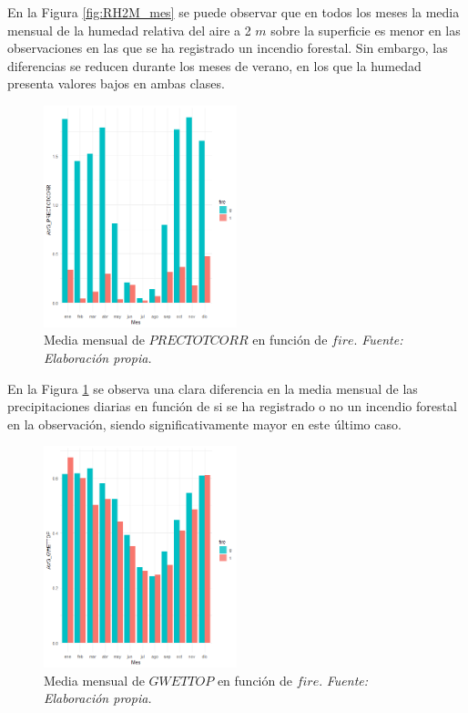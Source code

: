 \documentclass[12pt,a4paper,]{book}
\numberwithin{dummy}{section}
\theoremstyle{ocrenumbox}
\theoremstyle{blacknumex}
\theoremstyle{blacknumbox}
\theoremstyle{ocrenum}
\theoremstyle{ocrenum}
\begin{document}
En la Figura \ref{fig:RH2M_mes} se puede observar que en todos los meses
la media mensual de la humedad relativa del aire a 2 \(m\) sobre la
superficie es menor en las observaciones en las que se ha registrado un
incendio forestal. Sin embargo, las diferencias se reducen durante los
meses de verano, en los que la humedad presenta valores bajos en ambas
clases.

\begin{figure}[H]
\centering
\includegraphics[width =0.5\textwidth]{graficos/PRECTOTCORR_mes.png}
\caption[Media mensual de $PRECTOTCORR$ en función de $fire$]{Media mensual de $PRECTOTCORR$ en función de $fire$. \it Fuente: Elaboración propia.}
\label{fig:PRECTOTCORR_mes}
\end{figure}

En la Figura \ref{fig:PRECTOTCORR_mes} se observa una clara diferencia
en la media mensual de las precipitaciones diarias en función de si se
ha registrado o no un incendio forestal en la observación, siendo
significativamente mayor en este último caso.

\begin{figure}[H]
\centering
\includegraphics[width =0.5\textwidth]{graficos/GWETTOP_mes.png}
\caption[Media mensual de $GWETTOP$ en función de $fire$]{Media mensual de $GWETTOP$ en función de $fire$. \it Fuente: Elaboración propia.}
\label{fig:GWETTOP_mes}
\end{figure}
\end{document}
